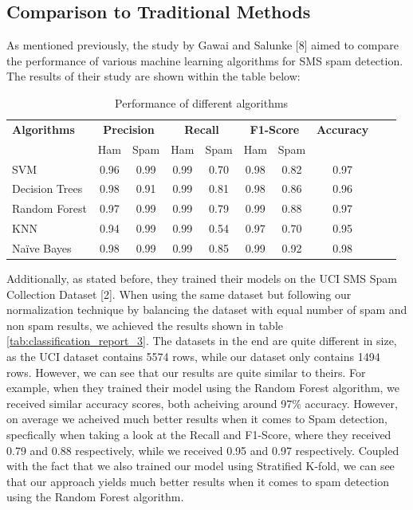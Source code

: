 \documentclass{article}
\begin{document}
\subsection{Comparison to Traditional Methods}

\noindent
As mentioned previously, the study by Gawai and Salunke [8] aimed to compare the performance of various machine learning algorithms for SMS spam detection. The results of their study are shown within the table below:

\begin{table}[htbp]
    \centering
    \caption{Performance of different algorithms} %
    \label{tab:performance} %
    
    \begin{tabular}{l cccc cccc c}
    \toprule
    \textbf{Algorithms} & \multicolumn{2}{c}{\textbf{Precision}} & \multicolumn{2}{c}{\textbf{Recall}} & \multicolumn{2}{c}{\textbf{F1-Score}} & \textbf{Accuracy} \\
    \cmidrule(lr){2-3} \cmidrule(lr){4-5} \cmidrule(lr){6-7}
    & Ham & Spam & Ham & Spam & Ham & Spam & \\
    \midrule
    SVM & 0.96 & 0.99 & 0.99 & 0.70 & 0.98 & 0.82 & 0.97 \\
    Decision Trees & 0.98 & 0.91 & 0.99 & 0.81 & 0.98 & 0.86 & 0.96 \\
    Random Forest & 0.97 & 0.99 & 0.99 & 0.79 & 0.99 & 0.88 & 0.97 \\
    KNN & 0.94 & 0.99 & 0.99 & 0.54 & 0.97 & 0.70 & 0.95 \\
    Naïve Bayes & 0.98 & 0.99 & 0.99 & 0.85 & 0.99 & 0.92 & 0.98 \\
    \bottomrule
    \end{tabular}
\end{table}

\noindent
Additionally, as stated before, they trained their models on the UCI SMS Spam Collection Dataset [2]. When using the same dataset but following our normalization technique by balancing the dataset with equal number of spam and non spam results, we achieved the results shown in table \ref{tab:classification_report_3}. The datasets in the end are quite different in size, as the UCI dataset contains 5574 rows, while our dataset only contains 1494 rows. However, we can see that our results are quite similar to theirs. For example, when they trained their model using the Random Forest algorithm, we received similar accuracy scores, both acheiving around 97\% accuracy. However, on average we acheived much better results when it comes to Spam detection, specfically when taking a look at the Recall and F1-Score, where they received 0.79 and 0.88 respectively, while we received 0.95 and 0.97 respectively. Coupled with the fact that we also trained our model using Stratified K-fold, we can see that our approach yields much better results when it comes to spam detection using the Random Forest algorithm.
\end{document}
